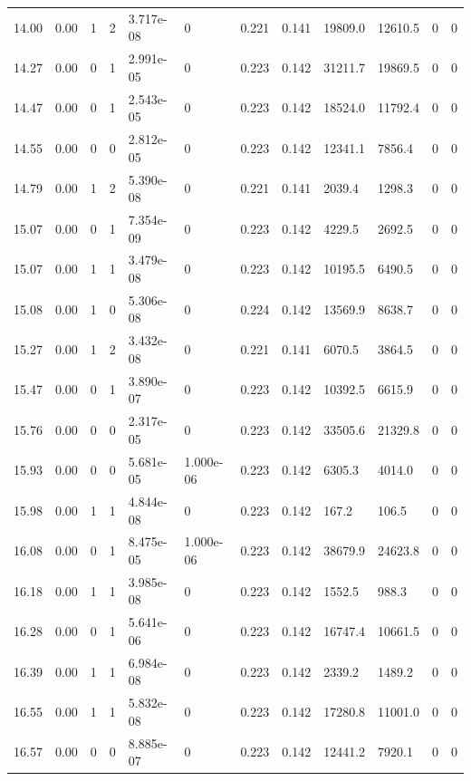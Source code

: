 \documentclass[preview]{standalone}
\begin{document}
{{{\begin{tabular}{L{1.2cm}C{1.2cm} C{0.3cm}C{0.5cm} C{1.4cm}C{1.4cm} C{1.4cm}C{1.4cm} C{1.6cm}C{1.6cm} C{1.6cm}C{1.6cm}}
  14.00  &  0.00  & 1     &  2 &  3.717e-08  & 0  &  0.221&   0.141& 19809.0 & 12610.5   &  0 & 0  \\ 
  14.27  &  0.00  & 0     &  1 &  2.991e-05  & 0  &  0.223&   0.142& 31211.7 & 19869.5   &  0 & 0  \\ 
  14.47  &  0.00  & 0     &  1 &  2.543e-05  & 0  &  0.223&   0.142& 18524.0 & 11792.4   &  0 & 0  \\ 
  14.55  &  0.00  & 0     &  0 &  2.812e-05  & 0  &  0.223&   0.142& 12341.1 & 7856.4   &  0 & 0  \\ 
  14.79  &  0.00  & 1     &  2 &  5.390e-08  & 0  &  0.221&   0.141& 2039.4 & 1298.3   &  0 & 0  \\ 
  15.07  &  0.00  & 0     &  1 &  7.354e-09  & 0  &  0.223&   0.142& 4229.5 & 2692.5   &  0 & 0  \\ 
  15.07  &  0.00  & 1     &  1 &  3.479e-08  & 0  &  0.223&   0.142& 10195.5 & 6490.5   &  0 & 0  \\ 
  15.08  &  0.00  & 1     &  0 &  5.306e-08  & 0  &  0.224&   0.142& 13569.9 & 8638.7   &  0 & 0  \\ 
  15.27  &  0.00  & 1     &  2 &  3.432e-08  & 0  &  0.221&   0.141& 6070.5 & 3864.5   &  0 & 0  \\ 
  15.47  &  0.00  & 0     &  1 &  3.890e-07  & 0  &  0.223&   0.142& 10392.5 & 6615.9   &  0 & 0  \\ 
  15.76  &  0.00  & 0     &  0 &  2.317e-05  & 0  &  0.223&   0.142& 33505.6 & 21329.8   &  0 & 0  \\ 
  15.93  &  0.00  & 0     &  0 &  5.681e-05  & 1.000e-06  &  0.223&   0.142& 6305.3 & 4014.0   &  0 & 0  \\ 
  15.98  &  0.00  & 1     &  1 &  4.844e-08  & 0  &  0.223&   0.142& 167.2 & 106.5   &  0 & 0  \\ 
  16.08  &  0.00  & 0     &  1 &  8.475e-05  & 1.000e-06  &  0.223&   0.142& 38679.9 & 24623.8   &  0 & 0  \\ 
  16.18  &  0.00  & 1     &  1 &  3.985e-08  & 0  &  0.223&   0.142& 1552.5 & 988.3   &  0 & 0  \\ 
  16.28  &  0.00  & 0     &  1 &  5.641e-06  & 0  &  0.223&   0.142& 16747.4 & 10661.5   &  0 & 0  \\ 
  16.39  &  0.00  & 1     &  1 &  6.984e-08  & 0  &  0.223&   0.142& 2339.2 & 1489.2   &  0 & 0  \\ 
  16.55  &  0.00  & 1     &  1 &  5.832e-08  & 0  &  0.223&   0.142& 17280.8 & 11001.0   &  0 & 0  \\ 
  16.57  &  0.00  & 0     &  0 &  8.885e-07  & 0  &  0.223&   0.142& 12441.2 & 7920.1   &  0 & 0  \\ 

\end{tabular}}}}
\end{document}
